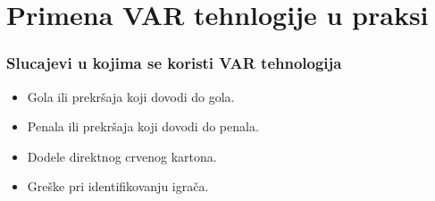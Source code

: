 \documentclass{beamer}
\begin{document}
\section{Primena VAR tehnlogije u praksi}

\begin{frame}
  \frametitle{Slucajevi u kojima se koristi VAR tehnologija}
  \begin{itemize}
    \item Gola ili prekršaja koji dovodi do gola.
    \item Penala ili prekršaja koji dovodi do penala.
    \item Dodele direktnog crvenog kartona.
    \item Greške pri identifikovanju igrača.
  \end{itemize}
\end{frame}
\end{document}
